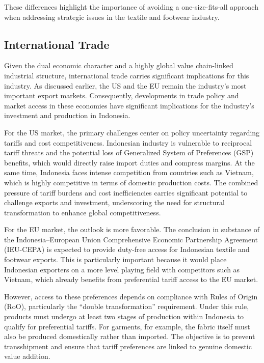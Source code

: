\documentclass[
  manuscript=article,
  layout=publish,
  year=2026,
  volume=1,
]{den}
\begin{document}
These differences highlight the importance of avoiding a
one-size-fits-all approach when addressing strategic issues in the
textile and footwear industry.

\subsection{International Trade}\label{international-trade}

Given the dual economic character and a highly global value chain-linked
industrial structure, international trade carries significant
implications for this industry. As discussed earlier, the US and the EU
remain the industry's most important export markets. Consequently,
developments in trade policy and market access in these economies have
significant implications for the industry's investment and production in
Indonesia.

For the US market, the primary challenges center on policy uncertainty
regarding tariffs and cost competitiveness. Indonesian industry is
vulnerable to reciprocal tariff threats and the potential loss of
Generalized System of Preferences (GSP) benefits, which would directly
raise import duties and compress margins. At the same time, Indonesia
faces intense competition from countries such as Vietnam, which is
highly competitive in terms of domestic production costs. The combined
pressure of tariff burdens and cost inefficiencies carries significant
potential to challenge exports and investment, underscoring the need for
structural transformation to enhance global competitiveness.

For the EU market, the outlook is more favorable. The conclusion in
substance of the Indonesia--European Union Comprehensive Economic
Partnership Agreement (IEU-CEPA) is expected to provide duty-free access
for Indonesian textile and footwear exports. This is particularly
important because it would place Indonesian exporters on a more level
playing field with competitors such as Vietnam, which already benefits
from preferential tariff access to the EU market.

However, access to these preferences depends on compliance with Rules of
Origin (RoO), particularly the ``double transformation'' requirement.
Under this rule, products must undergo at least two stages of production
within Indonesia to qualify for preferential tariffs. For garments, for
example, the fabric itself must also be produced domestically rather
than imported. The objective is to prevent transshipment and ensure that
tariff preferences are linked to genuine domestic value addition.
\end{document}
